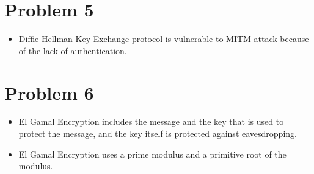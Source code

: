 \documentclass[11pt]{article}
\begin{document}
\section*{Problem 5}
\label{sec:orgab63d9b}
\begin{itemize}
\item Diffie-Hellman Key Exchange protocol is vulnerable to MITM attack because of
the lack of authentication.
\end{itemize}
\section*{Problem 6}
\label{sec:org68016e8}
\begin{itemize}
\item El Gamal Encryption includes the message and the key that is used to protect
the message, and the key itself is protected against eavesdropping.
\item El Gamal Encryption uses a prime modulus and a primitive root of the modulus.
\end{itemize}
\end{document}
